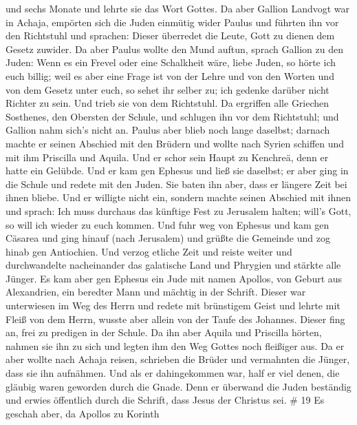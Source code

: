 und sechs Monate und lehrte sie das Wort Gottes.  Da aber
Gallion Landvogt war in Achaja, empörten sich die Juden einmütig wider
Paulus und führten ihn vor den Richtstuhl  und sprachen:
Dieser überredet die Leute, Gott zu dienen dem Gesetz zuwider.
 Da aber Paulus wollte den Mund auftun, sprach Gallion zu
den Juden: Wenn es ein Frevel oder eine Schalkheit wäre, liebe Juden, so
hörte ich euch billig;  weil es aber eine Frage ist von der
Lehre und von den Worten und von dem Gesetz unter euch, so sehet ihr
selber zu; ich gedenke darüber nicht Richter zu sein.  Und
trieb sie von dem Richtstuhl.  Da ergriffen alle Griechen
Sosthenes, den Obersten der Schule, und schlugen ihn vor dem Richtstuhl;
und Gallion nahm sich's nicht an.  Paulus aber blieb noch
lange daselbst; darnach machte er seinen Abschied mit den Brüdern und
wollte nach Syrien schiffen und mit ihm Priscilla und Aquila. Und er
schor sein Haupt zu Kenchreä, denn er hatte ein Gelübde. 
Und er kam gen Ephesus und ließ sie daselbst; er aber ging in die Schule
und redete mit den Juden.  Sie baten ihn aber, dass er
längere Zeit bei ihnen bliebe. Und er willigte nicht ein, 
sondern machte seinen Abschied mit ihnen und sprach: Ich muss durchaus
das künftige Fest zu Jerusalem halten; will's Gott, so will ich wieder
zu euch kommen. Und fuhr weg von Ephesus  und kam gen
Cäsarea und ging hinauf (nach Jerusalem) und grüßte die Gemeinde und zog
hinab gen Antiochien.  Und verzog etliche Zeit und reiste
weiter und durchwandelte nacheinander das galatische Land und Phrygien
und stärkte alle Jünger.  Es kam aber gen Ephesus ein Jude
mit namen Apollos, von Geburt aus Alexandrien, ein beredter Mann und
mächtig in der Schrift.  Dieser war unterwiesen im Weg des
Herrn und redete mit brünstigem Geist und lehrte mit Fleiß von dem
Herrn, wusste aber allein von der Taufe des Johannes. 
Dieser fing an, frei zu predigen in der Schule. Da ihn aber Aquila und
Priscilla hörten, nahmen sie ihn zu sich und legten ihm den Weg Gottes
noch fleißiger aus.  Da er aber wollte nach Achaja reisen,
schrieben die Brüder und vermahnten die Jünger, dass sie ihn aufnähmen.
Und als er dahingekommen war, half er viel denen, die gläubig waren
geworden durch die Gnade.  Denn er überwand die Juden
beständig und erwies öffentlich durch die Schrift, dass Jesus der
Christus sei. \# 19  Es geschah aber, da Apollos zu Korinth
